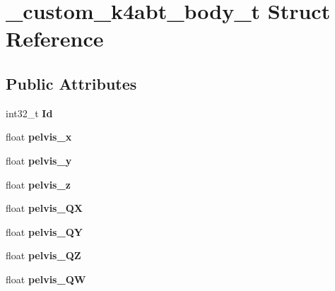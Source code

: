 \hypertarget{struct__custom__k4abt__body__t}{}\section{\+\_\+custom\+\_\+k4abt\+\_\+body\+\_\+t Struct Reference}
\label{struct__custom__k4abt__body__t}
\subsection*{Public Attributes}
\begin{DoxyCompactItemize}
\item 
\mbox{\label{struct__custom__k4abt__body__t_ad1f820a70b3960709d38f9115e0f1de9}} 
int32\+\_\+t {\bfseries Id}
\item 
\mbox{\label{struct__custom__k4abt__body__t_ad5adb3c13e64867b8df81d8fd1132df8}} 
float {\bfseries pelvis\+\_\+x}
\item 
\mbox{\label{struct__custom__k4abt__body__t_a7018dbb5be9e76cd244e1fe6482b18fa}} 
float {\bfseries pelvis\+\_\+y}
\item 
\mbox{\label{struct__custom__k4abt__body__t_adc11c10a0463805d756eba27bd57fb5a}} 
float {\bfseries pelvis\+\_\+z}
\item 
\mbox{\label{struct__custom__k4abt__body__t_a409244f19fb02bfe9578c7b1a1283968}} 
float {\bfseries pelvis\+\_\+\+QX}
\item 
\mbox{\label{struct__custom__k4abt__body__t_ac6d9090bd6f5bb0a81ac855e5007e462}} 
float {\bfseries pelvis\+\_\+\+QY}
\item 
\mbox{\label{struct__custom__k4abt__body__t_adcacfdc2a7246fe11cd26890b91eb595}} 
float {\bfseries pelvis\+\_\+\+QZ}
\item 
\mbox{\label{struct__custom__k4abt__body__t_a59cdcb164bd437bb3aa428073d17ee4e}} 
float {\bfseries pelvis\+\_\+\+QW}
\item 

\end{DoxyCompactItemize}
